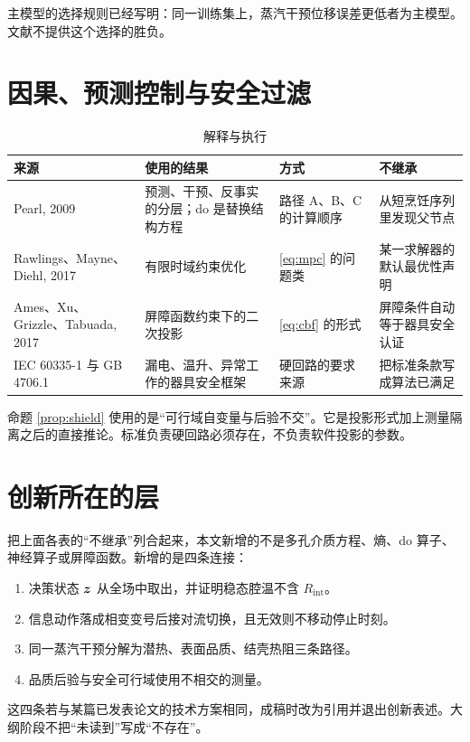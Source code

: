 主模型的选择规则已经写明：同一训练集上，蒸汽干预位移误差更低者为主模型。文献不提供这个选择的胜负。

\section{因果、预测控制与安全过滤}

\begin{table}[H]
\centering
\caption{解释与执行}
\begin{tabularx}{\textwidth}{lXll}
\toprule
来源 & 使用的结果 & 方式 & 不继承 \\
\midrule
Pearl, 2009 & 预测、干预、反事实的分层；do 是替换结构方程 & 路径 A、B、C 的计算顺序 & 从短烹饪序列里发现父节点 \\
Rawlings、Mayne、Diehl, 2017 & 有限时域约束优化 & \eqref{eq:mpc} 的问题类 & 某一求解器的默认最优性声明 \\
Ames、Xu、Grizzle、Tabuada, 2017 & 屏障函数约束下的二次投影 & \eqref{eq:cbf} 的形式 & 屏障条件自动等于器具安全认证 \\
IEC 60335-1 与 GB 4706.1 & 漏电、温升、异常工作的器具安全框架 & 硬回路的要求来源 & 把标准条款写成算法已满足 \\
\bottomrule
\end{tabularx}
\end{table}

命题 \ref{prop:shield} 使用的是“可行域自变量与后验不交”。它是投影形式加上测量隔离之后的直接推论。标准负责硬回路必须存在，不负责软件投影的参数。

\section{创新所在的层}

把上面各表的“不继承”列合起来，本文新增的不是多孔介质方程、熵、do 算子、神经算子或屏障函数。新增的是四条连接：

\begin{enumerate}
\item 决策状态 $\bm{z}$ 从全场中取出，并证明稳态腔温不含 $R_{\mathrm{int}}$。
\item 信息动作落成相变变号后接对流切换，且无效则不移动停止时刻。
\item 同一蒸汽干预分解为潜热、表面品质、结壳热阻三条路径。
\item 品质后验与安全可行域使用不相交的测量。
\end{enumerate}

这四条若与某篇已发表论文的技术方案相同，成稿时改为引用并退出创新表述。大纲阶段不把“未读到”写成“不存在”。
